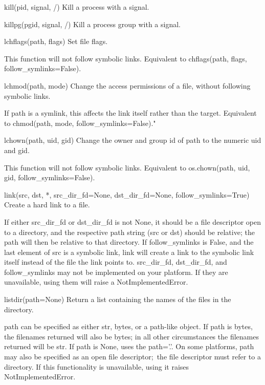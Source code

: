 \documentclass{article}
\begin{document}
    kill(pid, signal, /)
        Kill a process with a signal.

    killpg(pgid, signal, /)
        Kill a process group with a signal.

    lchflags(path, flags)
        Set file flags.

        This function will not follow symbolic links.
        Equivalent to chflags(path, flags, follow_symlinks=False).

    lchmod(path, mode)
        Change the access permissions of a file, without following symbolic links.

        If path is a symlink, this affects the link itself rather than the target.
        Equivalent to chmod(path, mode, follow_symlinks=False)."

    lchown(path, uid, gid)
        Change the owner and group id of path to the numeric uid and gid.

        This function will not follow symbolic links.
        Equivalent to os.chown(path, uid, gid, follow_symlinks=False).

    link(src, dst, *, src_dir_fd=None, dst_dir_fd=None, follow_symlinks=True)
        Create a hard link to a file.

        If either src_dir_fd or dst_dir_fd is not None, it should be a file
          descriptor open to a directory, and the respective path string (src or dst)
          should be relative; the path will then be relative to that directory.
        If follow_symlinks is False, and the last element of src is a symbolic
          link, link will create a link to the symbolic link itself instead of the
          file the link points to.
        src_dir_fd, dst_dir_fd, and follow_symlinks may not be implemented on your
          platform.  If they are unavailable, using them will raise a
          NotImplementedError.

    listdir(path=None)
        Return a list containing the names of the files in the directory.

        path can be specified as either str, bytes, or a path-like object.  If path is bytes,
          the filenames returned will also be bytes; in all other circumstances
          the filenames returned will be str.
        If path is None, uses the path='.'.
        On some platforms, path may also be specified as an open file descriptor;\
          the file descriptor must refer to a directory.
          If this functionality is unavailable, using it raises NotImplementedError.
\end{document}
